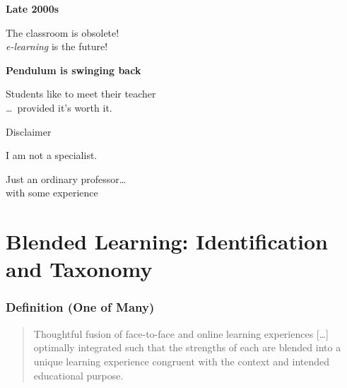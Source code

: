 \begin{frame}
  \begin{center}
    \textbf{Late 2000s}
  \end{center}
  \begin{center}
    The classroom is obsolete! \\
    \emph{e-learning} is the future!
  \end{center}
\end{frame}

\begin{frame}
  \begin{center}
    \textbf{Pendulum is swinging back}
  \end{center}
  \begin{center}
    Students like to meet their teacher \\
    \pause
    \dots\ provided it's worth it.
  \end{center}
\end{frame}

\begin{frame}[standout]
  Disclaimer \\
  \bigskip

  I am not a specialist.

  Just an ordinary professor\dots \\
  with some experience
\end{frame}

\section{Blended Learning: \newline Identification and Taxonomy}

\begin{frame}
  \frametitle{Definition (One of Many)}

  \begin{quote}
    Thoughtful fusion of face-to-face and online learning experiences
    [\dots] optimally integrated such that \alert{the strengths of
      each} are blended into a unique learning experience congruent
    with the context and intended educational purpose.
    \citep{Garrison:blended:2007}
  \end{quote}
\end{frame}

